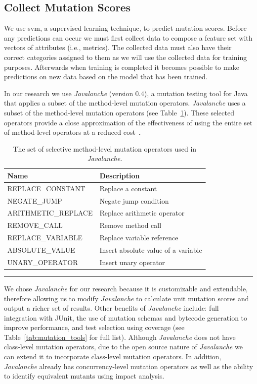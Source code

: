 \subsection{Collect Mutation Scores}
\label{subsec:approach_collect_mutation_scores}
We use \gls{svm}, a supervised learning technique, to predict mutation scores. Before any predictions can occur we must first collect data to compose a feature set with vectors of attributes (i.e., metrics). The collected data must also have their correct categories assigned to them as we will use the collected data for training purposes. Afterwards when training is completed it becomes possible to make predictions on new data based on the model that has been trained.

In our research we use \emph{Javalanche} (version 0.4), a mutation testing tool for Java~\cite{SZ09} that applies a subset of the method-level mutation operators. \emph{Javalanche} uses a subset of the method-level mutation operators (see Table~\ref{tab:javalanche_operators}). These selected operators provide a close approximation of the effectiveness of using the entire set of method-level operators at a reduced cost~\cite{OLR+96}.

\begin{table}[!tb]
  \centering
  \begin{tabular}{|l|l|}
    \hline
    \rowcolor[RGB]{169,196,223}
    \textbf{Name} & \textbf{Description} \\
    \hline REPLACE\_CONSTANT & Replace a constant \\
    \hline NEGATE\_JUMP & Negate jump condition \\
    \hline ARITHMETIC\_REPLACE & Replace arithmetic operator \\
    \hline REMOVE\_CALL & Remove method call \\
    \hline REPLACE\_VARIABLE & Replace variable reference\\
    \hline ABSOLUTE\_VALUE & Insert absolute value of a variable \\
    \hline UNARY\_OPERATOR & Insert unary operator \\
    \hline
  \end{tabular}
  \caption{The set of selective method-level mutation operators used in \emph{Javalanche}.}
  \label{tab:javalanche_operators}
  \vspace{2mm}
  \hrule
\end{table}

We chose \emph{Javalanche} for our research because it is customizable and extendable, therefore allowing us to modify \emph{Javalanche} to calculate unit mutation scores and output a richer set of results. Other benefits of \emph{Javalanche} include: full integration with JUnit, the use of mutation schemas and bytecode generation to improve performance, and test selection using coverage (see Table~\ref{tab:mutation_tools} for full list). Although \emph{Javalanche} does not have class-level mutation operators, due to the open source nature of \emph{Javalanche} we can extend it to incorporate class-level mutation operators. In addition, \emph{Javalanche} already has concurrency-level mutation operators as well as the ability to identify equivalent mutants using impact analysis.

